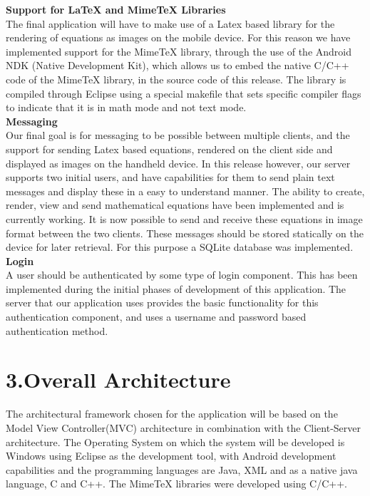 \documentclass[29pt,a4paper]{moderncv}
\begin{document}
		\noindent\textbf{Support for LaTeX and MimeTeX Libraries}
		\\The final application will have to make use of a Latex based library for the rendering of equations as images on the mobile device. For this reason we have implemented support for the MimeTeX library, through the use of the Android NDK (Native Development Kit), which allows us to embed the native C/C++ code of the MimeTeX library, in the source code of this release. The library is compiled through Eclipse using a special makefile that sets specific compiler flags to indicate that it is in math mode and not text mode.\\
		
		
		\noindent\textbf{Messaging}
		\\Our final goal is for messaging to be possible between multiple clients, and the support for sending Latex based equations, rendered on the client side and displayed as images on the handheld device. In this release however, our server supports two initial users, and have capabilities for them to send plain text messages and display these in a easy to understand manner.  
		\parindent 5mm The ability to create, render, view and send mathematical equations have been implemented and is currently working. It is now possible to send and receive these equations in image format between the two clients.
		These messages should be stored statically on the device for later retrieval.  For this purpose a SQLite database was implemented.\\
		
		\noindent\textbf{Login}
		\\A user should be authenticated by some type of login component.  This has been implemented during the initial phases of development of this application.  The server that our application uses provides the basic functionality for this authentication component, and uses a username and password based authentication method.
		
		
	\vspace{5mm}
	
\newpage	
	\section*{\textbf{3.Overall Architecture}}
	\vspace{4mm}
		\noindent The architectural framework chosen for the application will be based on the Model View Controller(MVC) architecture in combination with the Client-Server architecture. The Operating System on which the system will be developed is Windows using Eclipse as the development tool, with Android development capabilities and the programming languages are Java, XML and as a native java language, C and C++. The MimeTeX libraries were developed using C/C++.
		
\end{document}
